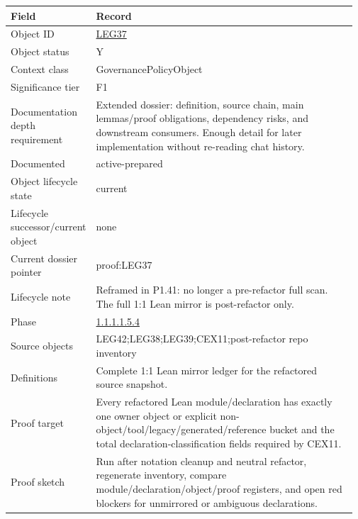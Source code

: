 \begin{longtable}{L{0.16\linewidth} L{0.81\linewidth}}
\hline
\textbf{Field} & \textbf{Record}\\
\hline
Object ID & \hyperlink{object-row-LEG37}{LEG37}\\
\hline\addlinespace[0.20em]
Object status & Y\\
\hline\addlinespace[0.20em]
Context class & GovernancePolicyObject\\
\hline\addlinespace[0.20em]
Significance tier & F1\\
\hline\addlinespace[0.20em]
Documentation depth requirement & Extended dossier: definition, source chain, main lemmas/\allowbreak{}proof obligations, dependency risks, and downstream consumers. Enough detail for later implementation without re-reading chat history.\\
\hline\addlinespace[0.20em]
Documented & active-prepared\\
\hline\addlinespace[0.20em]
Object lifecycle state & current\\
\hline\addlinespace[0.20em]
Lifecycle successor/\allowbreak{}current object & none\\
\hline\addlinespace[0.20em]
Current dossier pointer & proof:LEG37\\
\hline\addlinespace[0.20em]
Lifecycle note & Reframed in P1.41: no longer a pre-refactor full scan. The full 1:1 Lean mirror is post-refactor only.\\
\hline\addlinespace[0.20em]
Phase & \hyperlink{phase-row-1-1-1-1-5-4}{1.1.1.1.5.4}\\
\hline\addlinespace[0.20em]
Source objects & LEG42;\newline LEG38;\newline LEG39;\newline CEX11;\newline post-refactor repo inventory\\
\hline\addlinespace[0.20em]
Definitions & Complete 1:1 Lean mirror ledger for the refactored source snapshot.\\
\hline\addlinespace[0.20em]
Proof target & Every refactored Lean module/\allowbreak{}declaration has exactly one owner object or explicit non-object/\allowbreak{}tool/\allowbreak{}legacy/\allowbreak{}generated/\allowbreak{}reference bucket and the total declaration-classification fields required by CEX11.\\
\hline\addlinespace[0.20em]
Proof sketch & Run after notation cleanup and neutral refactor, regenerate inventory, compare module/\allowbreak{}declaration/\allowbreak{}object/\allowbreak{}proof registers, and open red blockers for unmirrored or ambiguous declarations.\\

\end{longtable}
